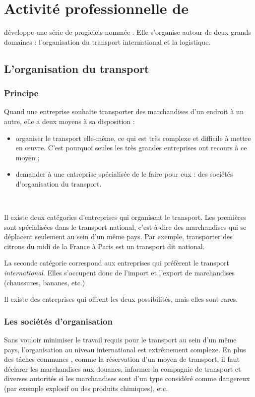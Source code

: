 \chapter{Activité professionnelle de \solulog}
\solulog{} développe une série de progiciels nommée \integrale. Elle s'organise autour de deux grands domaines : l'organisation du transport international et la logistique.

\section{L'organisation du transport}
\subsection{Principe}
Quand une entreprise souhaite transporter des marchandises d'un endroit à un autre, elle a deux moyens à sa disposition :
\begin{itemize}
	\item organiser le transport elle-même, ce qui est très complexe et difficile à mettre en \oe uvre. C'est pourquoi seules les très grandes entreprises ont recours à ce moyen ;
	\item demander à une entreprise spécialisée de le faire pour eux : des sociétés d'organisation du transport.
\end{itemize}

~

Il existe deux catégories d'entreprises qui organisent le transport. Les premières sont spécialisées dans le transport national, c'est-à-dire des marchandises qui se déplacent seulement au sein d'un même pays. Par exemple, transporter des citrons du midi de la France à Paris est un transport dit national.

La seconde catégorie correspond aux entreprises qui préfèrent le transport \emph{international}. Elles s'occupent donc de l'import et l'export de marchandises (chaussures, bananes, etc.)

Il existe des entreprises qui offrent les deux possibilités, mais elles sont rares.


\subsection{Les sociétés d'organisation}
Sans vouloir minimiser le travail requis pour le transport au sein d'un même pays, l'organisation au niveau international est extrêmement complexe. En plus des tâches \og communes \fg {}, comme la réservation d'un moyen de transport, il faut déclarer les marchandises aux douanes, informer la compagnie de transport et diverses autorités si les marchandises sont d'un type considéré comme dangereux (par exemple explosif ou des produits chimiques), etc.

